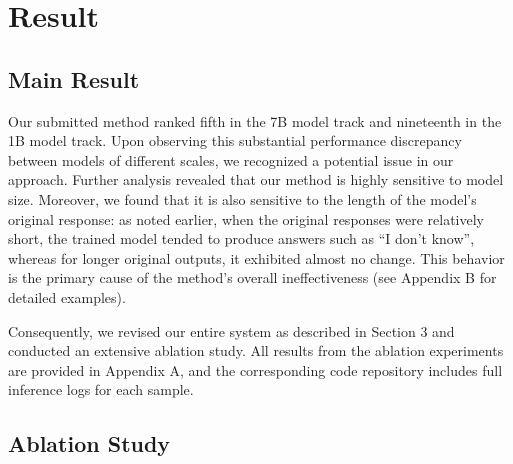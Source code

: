 \documentclass[11pt]{article}
\begin{document}
\section{Result}



\subsection{Main Result}


Our submitted method ranked fifth in the 7B model track and nineteenth in the 1B model track. Upon observing this substantial performance discrepancy between models of different scales, we recognized a potential issue in our approach. Further analysis revealed that our method is highly sensitive to model size. Moreover, we found that it is also sensitive to the length of the model’s original response: as noted earlier, when the original responses were relatively short, the trained model tended to produce answers such as “I don’t know”, whereas for longer original outputs, it exhibited almost no change. This behavior is the primary cause of the method’s overall ineffectiveness (see Appendix B for detailed examples).

Consequently, we revised our entire system as described in Section 3 and conducted an extensive ablation study. All results from the ablation experiments are provided in Appendix A, and the corresponding code repository includes full inference logs for each sample.
\subsection{Ablation Study}
\end{document}
